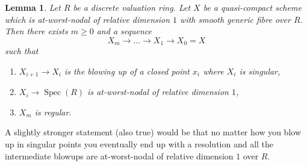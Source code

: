 \documentclass{stacks-project}
\theoremstyle{plain}
\newtheorem{lemma}[subsection]{Lemma}
\theoremstyle{definition}
\theoremstyle{remark}
\numberwithin{equation}{subsection}
\def\Spec{\mathop{\mathrm{Spec}}}
\begin{document}
\begin{lemma}
\label{lemma-blowup-at-worst-nodal}
Let $R$ be a discrete valuation ring. Let $X$ be a quasi-compact scheme which
is at-worst-nodal of relative dimension $1$ with smooth generic fibre over $R$.
Then there exists $m \geq 0$ and a sequence
$$
X_m \to \ldots \to X_1 \to X_0 = X
$$
such that
\begin{enumerate}
\item $X_{i + 1} \to X_i$ is the blowing up of a closed point
$x_i$ where $X_i$ is singular,
\item $X_i \to \Spec(R)$ is at-worst-nodal of relative dimension $1$,
\item $X_m$ is regular.
\end{enumerate}
\end{lemma}

\noindent
A slightly stronger statement (also true) would be that no matter how
you blow up in singular points you eventually end up with a resolution
and all the intermediate blowups are
at-worst-nodal of relative dimension $1$ over $R$.
\end{document}
